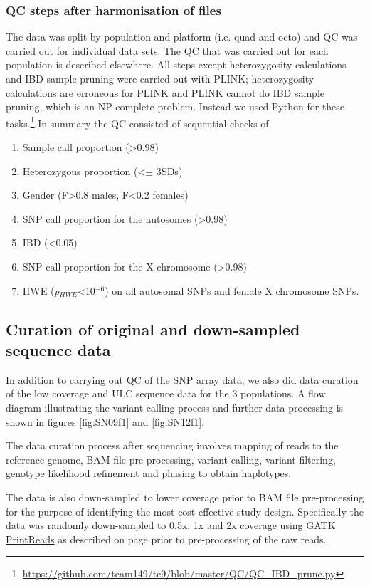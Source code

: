 \subsubsection{QC steps after harmonisation of files}
The data was split by population and platform (i.e. quad and octo) and \gls{QC} was carried out for individual data sets. The \gls{QC} that was carried out for each population is described elsewhere.\cite{Gurdasani2015} All steps except heterozygosity calculations and IBD sample pruning were carried out with PLINK; heterozygosity calculations are erroneous for PLINK and PLINK cannot do \gls{IBD} sample pruning, which is an \gls{NP}-complete problem. Instead we used Python for these tasks.\footnote{\url{https://github.com/team149/tc9/blob/master/QC/QC_IBD_prune.py}} In summary the QC consisted of sequential checks of
\begin{enumerate}
\item Sample call proportion (>0.98)
\item Heterozygous proportion (\textless $\pm$ 3\glspl{SD})
\item Gender (F>0.8 males, F<0.2 females)
\item SNP call proportion for the autosomes (\textgreater0.98)
\item IBD (<0.05)
\item SNP call proportion for the X chromosome (\textgreater0.98)
\item \gls{HWE} (\textit{p}$_{HWE}$<10$^{-6}$) on all autosomal SNPs and female X chromosome SNPs.
\end{enumerate}



\subsection{Curation of original and down-sampled sequence data}
In addition to carrying out \gls{QC} of the \gls{SNP} array data, we also did data curation of the low coverage and \gls{ULC} sequence data for the 3 populations. A flow diagram illustrating the variant calling process and further data processing is shown in figures \ref{fig:SN09f1} and \ref{fig:SN12f1}.


The data curation process after sequencing involves mapping of reads to the reference genome, \gls{BAM} file pre-processing, variant calling, variant filtering, genotype likelihood refinement and phasing to obtain haplotypes.

The data is also down-sampled to lower coverage prior to \gls{BAM} file pre-processing for the purpose of identifying the most cost effective study design. Specifically the data was randomly down-sampled to 0.5x, 1x and 2x coverage using \href{https://www.broadinstitute.org/gatk/gatkdocs/org_broadinstitute_gatk_tools_walkers_readutils_PrintReads.php}{GATK PrintReads} as described on page \pageref{subsubsec:downsampling} prior to pre-processing of the raw reads.

